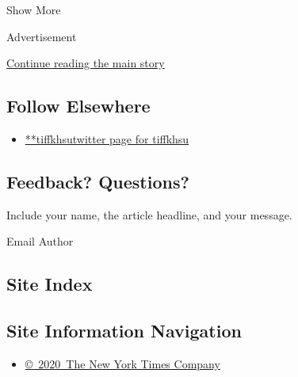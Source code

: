 Show More

Advertisement

\protect\hyperlink{after-mid2}{Continue reading the main story}

\hypertarget{follow-elsewhere}{%
\subsection{Follow Elsewhere}\label{follow-elsewhere}}

\begin{itemize}
\tightlist
\item
  \href{https://twitter.com/tiffkhsu}{**tiffkhsutwitter page for
  tiffkhsu}
\end{itemize}

\hypertarget{feedback-questions}{%
\subsection{Feedback? Questions?}\label{feedback-questions}}

Include your name, the article headline, and your message.

Email Author

\hypertarget{site-index}{%
\subsection{Site Index}\label{site-index}}

\hypertarget{site-information-navigation}{%
\subsection{Site Information
Navigation}\label{site-information-navigation}}

\begin{itemize}
\tightlist
\item
  \href{https://help.nytimes3xbfgragh.onion/hc/en-us/articles/115014792127-Copyright-notice}{©~2020~The
  New York Times Company}
\end{itemize}

